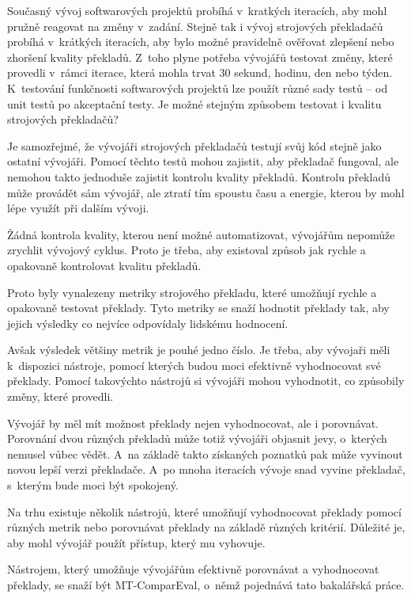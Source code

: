 Současný vývoj softwarových projektů probíhá v~kratkých iteracích,
  aby mohl pružně reagovat na změny v~zadání.
Stejně tak i vývoj strojových překladačů probíhá v~krátkých iteracích,
  aby bylo možné pravidelně ověřovat zlepšení nebo zhoršení kvality překladů.
Z~toho plyne potřeba vývojářů testovat změny,
  které provedli v~rámci iterace,
  která mohla trvat 30 sekund, hodinu, den nebo týden.
K~testování funkčnosti softwarových projektů lze použít různé sady testů -- od unit testů po akceptační testy.
Je možné stejným způsobem testovat i kvalitu strojových překladačů?

Je samozřejmé, 
  že vývojáři strojových překladačů testují svůj kód stejně jako ostatní vývojáři.
Pomocí těchto testů mohou zajistit,
  aby překladač fungoval,
  ale nemohou takto jednoduše zajistit kontrolu kvality překladů.
Kontrolu překladů může provádět sám vývojář,
  ale ztratí tím spoustu času a energie,
  kterou by mohl lépe využít při dalším vývoji.

Žádná kontrola kvality, kterou není možné automatizovat,
  vývojářům nepomůže zrychlit vývojový cyklus.
Proto je třeba,
  aby existoval způsob jak rychle a opakovaně kontrolovat kvalitu překladů.

Proto byly vynalezeny metriky strojového překladu,
  které umožňují rychle a opakovaně testovat překlady.
Tyto metriky se snaží hodnotit překlady tak,
  aby jejich výsledky co nejvíce odpovídaly lidskému hodnocení.

Avšak výsledek většiny metrik je pouhé jedno číslo.
Je třeba, aby vývojaři měli k~dispozici nástroje,
  pomocí kterých budou moci efektivně vyhodnocovat své překlady.
Pomocí takovýchto nástrojů si vývojáři mohou vyhodnotit,
  co způsobily změny, které provedli.

Vývojář by měl mít možnost překlady nejen vyhodnocovat,
  ale i porovnávat.
Porovnání dvou různých překladů může totiž vývojáři objasnit jevy,
  o~kterých nemusel vůbec vědět.
A~na základě takto získaných poznatků pak může vyvinout novou lepší verzi překladače.
A~po mnoha iteracích vývoje snad vyvine překladač,
  s~kterým bude moci být spokojený.

Na trhu existuje několik nástrojů,
  které umožňují vyhodnocovat překlady pomocí různých metrik
  nebo porovnávat překlady na základě různých kritérií.
Důležité je,
  aby mohl vývojář použít přístup,
  který mu vyhovuje.

Nástrojem,
  který umožňuje vývojářům efektivně porovnávat a vyhodnocovat překlady,
  se snaží být \mbox{MT-ComparEval}, 
  o~němž pojednává tato bakalářská práce.

